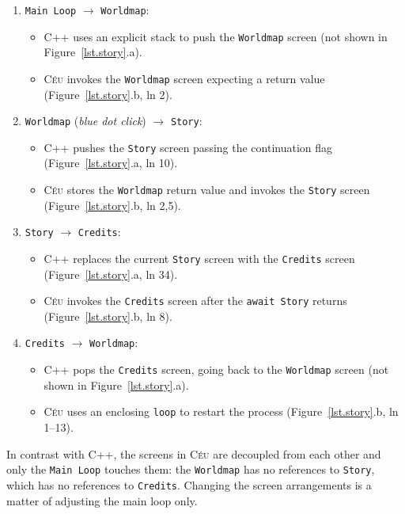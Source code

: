 \documentclass[10pt, conference, compsocconf]{IEEEtran}
\newcommand{\CEU}{\textsc{C\'{e}u}\xspace}
\newcommand{\code}[1] {{\small{\texttt{#1}}}}
\begin{document}
\begin{enumerate}
\item \code{Main Loop} $\longrightarrow$ \code{Worldmap}:
    \begin{itemize}
    \item C++ uses an explicit stack to push the \code{Worldmap} screen (not
          shown in Figure~\ref{lst.story}.a).
    \item \CEU invokes the \code{Worldmap} screen expecting a return value
          (Figure~\ref{lst.story}.b, ln 2).
    \end{itemize}
\item \code{Worldmap} (\emph{blue dot click}) $\longrightarrow$ \code{Story}:
    \begin{itemize}
    \item C++ pushes the \code{Story} screen passing the continuation flag
          (Figure~\ref{lst.story}.a, ln 10).
    \item \CEU stores the \code{Worldmap} return value and invokes the \code{Story} screen
          (Figure~\ref{lst.story}.b, ln 2,5).
    \end{itemize}
\item \code{Story} $\longrightarrow$ \code{Credits}:
    \begin{itemize}
    \item C++ replaces the current \code{Story} screen with the \code{Credits}
          screen (Figure~\ref{lst.story}.a, ln 34).
    \item \CEU invokes the \code{Credits} screen after the \code{await Story}
          returns (Figure~\ref{lst.story}.b, ln 8).
    \end{itemize}
\item \code{Credits} $\longrightarrow$ \code{Worldmap}:
    \begin{itemize}
    \item C++ pops the \code{Credits} screen, going back to the \code{Worldmap}
          screen (not shown in Figure~\ref{lst.story}.a).
    \item \CEU uses an enclosing \code{loop} to restart the process
          (Figure~\ref{lst.story}.b, ln 1--13).
    \end{itemize}
\end{enumerate}

In contrast with C++, the screens in \CEU are decoupled from each other and
only the \code{Main Loop} touches them: the \code{Worldmap} has no references
to \code{Story}, which has no references to \code{Credits}.
Changing the screen arrangements is a matter of adjusting the main loop only.
\end{document}
